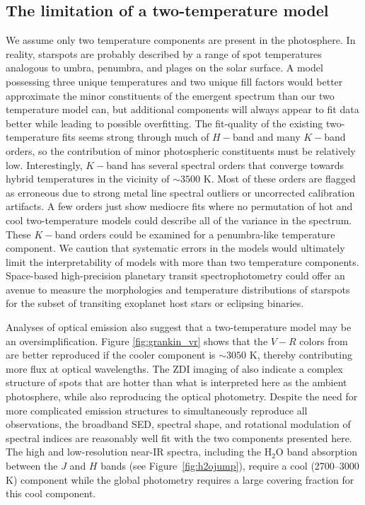 \documentclass[twocolumn]{emulateapj}%
\begin{document}
\subsection{The limitation of a two-temperature model}

We assume only two temperature components are present in the photosphere.  In reality, starspots are probably described by a range of spot temperatures analogous to umbra, penumbra, and plages on the solar surface.  A model possessing three unique temperatures and two unique fill factors would better approximate the minor constituents of the emergent spectrum than our two temperature model can, but additional components will always appear to fit data better while leading to possible overfitting.  The fit-quality of the existing two-temperature fits seems strong through much of $H-$band and many $K-$band orders, so the contribution of minor photospheric constituents must be relatively low.  Interestingly, $K-$band has several spectral orders that converge towards hybrid temperatures in the vicinity of $\sim3500$ K.  Most of these orders are flagged as erroneous due to strong metal line spectral outliers or uncorrected calibration artifacts.  A few orders just show mediocre fits where no permutation of hot and cool two-temperature models could describe all of the variance in the spectrum.  These $K-$band orders could be examined for a penumbra-like temperature component.  We caution that systematic errors in the models would ultimately limit the interpretability of models with more than two temperature components.  Space-based high-precision planetary transit spectrophotometry could offer an avenue to measure the morphologies and temperature distributions of starspots for the subset of transiting exoplanet host stars or eclipsing binaries.

Analyses of optical emission also suggest that a two-temperature model may be an oversimplification.  Figure \ref{fig:grankin_vr} shows that the $V-R$ colors from \citet{grankin08} are better reproduced if the cooler component is $\sim 3050$ K, thereby contributing more flux at optical wavelengths.  The ZDI imaging of \citet{donati14} also indicate a complex structure of spots that are hotter than what is interpreted here as the ambient photosphere, while also reproducing the optical photometry.  Despite the need for more complicated emission structures to simultaneously reproduce all observations, the broadband SED, spectral shape, and rotational modulation of spectral indices are reasonably well fit with the two components presented here.  The high and low-resolution near-IR spectra, including the H$_2$O band absorption between the $J$ and $H$ bands (see Figure~\ref{fig:h2ojump}), require a cool (2700--3000 K) component while the global photometry requires a large covering fraction for this cool component.  
\end{document}
